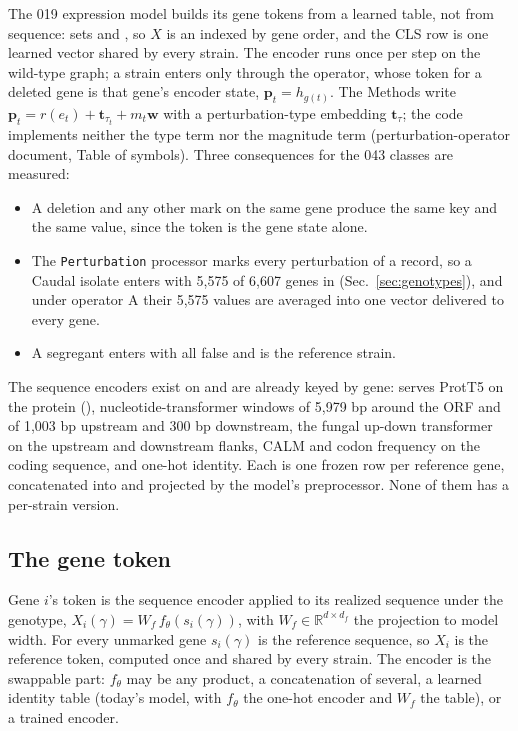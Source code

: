 The 019 expression model builds its gene tokens from a learned table, not from
sequence:  sets  and
, so $X$ is an 
indexed by gene order, and the CLS row is one learned vector shared by every strain. The
encoder runs once per step on the wild-type graph; a strain enters only through the
operator, whose token for a deleted gene is that gene's encoder state,
$\mathbf{p}_t=h_{g(t)}$. The Methods write $\mathbf{p}_t=r(e_t)+\mathbf{t}_{\tau_t}+m_t\mathbf{w}$
with a perturbation-type embedding $\mathbf{t}_\tau$; the code implements neither the type
term nor the magnitude term (perturbation-operator document, Table of symbols). Three
consequences for the 043 classes are measured:
\begin{itemize}
\item A deletion and any other mark on the same gene produce the same key and the same
value, since the token is the gene state alone.
\item The \texttt{Perturbation} processor marks every perturbation of a record, so a
Caudal isolate enters with 5{,}575 of 6{,}607 genes in 
(Sec.~\ref{sec:genotypes}), and under operator A their 5{,}575 values are averaged into
one vector delivered to every gene.
\item A segregant enters with  all false and is the reference strain.
\end{itemize}
The sequence encoders exist on  and are already keyed by gene:
 serves ProtT5 on the protein (),
nucleotide-transformer windows of 5{,}979 bp around the ORF and of 1{,}003 bp upstream and
300 bp downstream, the fungal up-down transformer on the upstream and downstream
flanks, CALM and codon frequency on the coding sequence, and one-hot identity. Each is
one frozen row per reference gene, concatenated into  and
projected by the model's preprocessor. None of them has a per-strain version.

\subsection{The gene token}
\label{sec:input-token}

 Gene $i$'s token is the sequence encoder applied to its realized
sequence under the genotype, $X_i(\gamma)=W_f\,f_\theta(s_i(\gamma))$, with
$W_f\in\mathbb{R}^{d\times d_f}$ the projection to model width. For every unmarked gene
$s_i(\gamma)$ is the reference sequence, so $X_i$ is the reference token, computed once
and shared by every strain. The encoder is the swappable part: $f_\theta$ may be any
 product, a concatenation of several, a learned identity
table (today's model, with $f_\theta$ the one-hot encoder and $W_f$ the table), or a
trained encoder.

